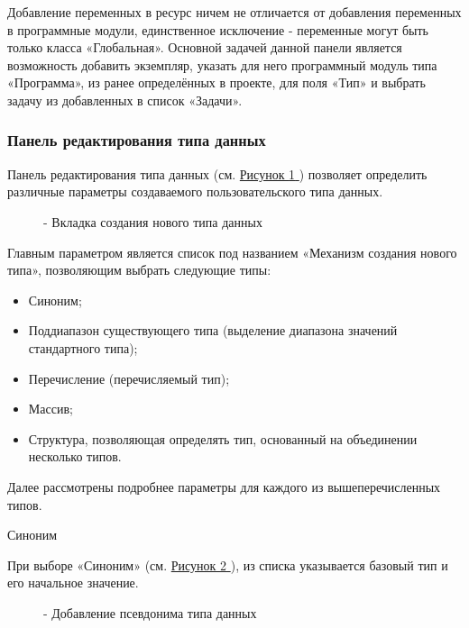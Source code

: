 \documentclass[letterpaper,10pt,russian]{sphinxmanual}
\begin{document}
Добавление переменных в ресурс ничем не отличается от добавления
переменных в программные модули, единственное исключение - переменные
могут быть только класса «Глобальная». Основной задачей данной панели
является возможность добавить экземпляр, указать для него программный
модуль типа «Программа», из ранее определённых в проекте, для поля «Тип»
и выбрать задачу из добавленных в список «Задачи».


\subsubsection{Панель редактирования типа данных}
\label{usage_guide/ide_components:id7}
Панель редактирования типа данных (см. \hyperref[usage_guide/ide_components:image117]{Рисунок \ref{usage_guide/ide_components:image117} }) позволяет определить
различные параметры создаваемого пользовательского типа данных.
\begin{figure}[htbp]
\centering
\capstart

\noindent{}
\caption{- Вкладка создания нового типа данных}\label{usage_guide/ide_components:image117}\end{figure}

Главным параметром является список под названием «Механизм создания
нового типа», позволяющим выбрать следующие типы:
\begin{itemize}
\item {} 
Синоним;

\item {} 
Поддиапазон существующего типа (выделение диапазона значений
стандартного типа);

\item {} 
Перечисление (перечисляемый тип);

\item {} 
Массив;

\item {} 
Структура, позволяющая определять тип, основанный на объединении
несколько типов.

\end{itemize}

Далее рассмотрены подробнее параметры для каждого из вышеперечисленных
типов.

Синоним

При выборе «Синоним» (см. \hyperref[usage_guide/ide_components:image118]{Рисунок \ref{usage_guide/ide_components:image118} }), из списка указывается базовый тип и
его начальное значение.
\begin{figure}[htbp]
\centering
\capstart

\noindent{}
\caption{- Добавление псевдонима типа данных}\label{usage_guide/ide_components:image118}\end{figure}
\end{document}
